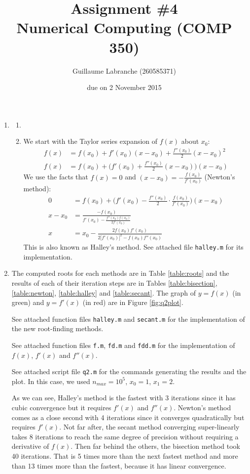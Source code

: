 \documentclass{article}
\author{Guillaume Labranche (260585371)}
\title{Assignment \#4\\Numerical Computing (COMP 350)}
\date{due on 2 November 2015}
\begin{document}
\maketitle
 
\begin{enumerate}
\item \begin{enumerate}
\item 
\item We start with the Taylor series expansion of $f(x)$ about $x_0$:
\begin{align*}
f(x) &= f(x_0) + f'(x_0)(x-x_0) + \frac{f''(x_0)}{2}(x-x_0)^2 \\
f(x) &= f(x_0) + \Big(f'(x_0) + \frac{f''(x_0)}{2}(x-x_0)\Big) (x-x_0)
\end{align*}
We use the facts that $f(x)=0$ and $(x-x_0)=-\frac{f(x_0)}{f'(x_0)}$ (Newton's method):
\begin{align*}
0 &= f(x_0) + \Big(f'(x_0) - \frac{f''(x_0)}{2} \cdot \frac{f(x_0)}{f'(x_0)} \Big) (x-x_0) \\
x-x_0 &= \frac{-f(x_0)}{f'(x_0) - \frac{f''(x_0) f(x_0)}{2 f'(x_0)}} \\
x &= x_0 - \frac{2f(x_0)f'(x_0)}{2\big[f'(x_0)\big]^2 - f(x_0) f''(x_0)} 
\end{align*}
This is also known as Halley's method. See attached file \texttt{halley.m} for its implementation.
\end{enumerate}
\item The computed roots for each methods are in Table \ref{table:roots} and the results of each of their iteration steps are in Tables \ref{table:bisection}, \ref{table:newton}, \ref{table:halley} and \ref{table:secant}. The graph of $y=f(x)$ (in green) and $y=f'(x)$ (in red) are in Figure \ref{fig:q2plot}.

See attached function files \texttt{halley.m} and \texttt{secant.m} for the implementation of the new root-finding methods.

See attached function files \texttt{f.m}, \texttt{fd.m} and \texttt{fdd.m} for the implementation of $f(x)$, $f'(x)$ and $f''(x)$.

See attached script file \texttt{q2.m} for the commands generating the results and the plot. In this case, we used $n_{max}=10^5$, $x_0=1$, $x_1=2$.

As we can see, Halley's method is the fastest with 3 iterations since it has cubic convergence but it requires $f'(x)$ and $f''(x)$. Newton's method comes as a close second with 4 iterations since it converges quadratically but requires $f'(x)$. Not far after, the secant method converging super-linearly takes 8 iterations to reach the same degree of precision without requiring a derivative of $f(x)$. Then far behind the others, the bisection method took 40 iterations. That is 5 times more than the next fastest method and more than 13 times more than the fastest, because it has linear convergence.


\end{enumerate}
\end{document}
